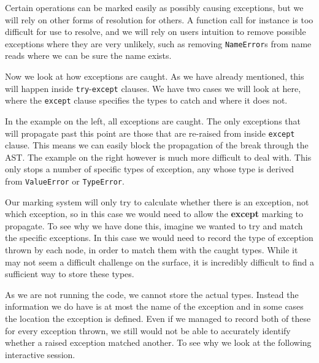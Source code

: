 \documentclass[twoside,a4paper]{report}
\begin{document}
Certain operations can be marked easily as possibly causing exceptions, but we will rely on other forms of resolution for others. A function call for instance
is too difficult for use to resolve, and we will rely on users intuition to remove possible exceptions where they are very unlikely, such as removing
\texttt{NameError}s from name reads where we can be sure the name exists.

Now we look at how exceptions are caught. As we have already mentioned, this will happen inside \texttt{try}-\texttt{except} clauses. We have two cases we
will look at here, where the \texttt{except} clause specifies the types to catch and where it does not.

\begin{minipage}[b]{0.4\linewidth}
\centering

\end{minipage}
\hspace{1cm}
\begin{minipage}[b]{0.5\linewidth}
\centering

\end{minipage}

In the example on the left, all exceptions are caught. The only exceptions that will propagate past this point are those that are re-raised from inside
\texttt{except} clause. This means we can easily block the propagation of the break through the AST. The example on the right however is much more difficult
to deal with. This only stops a number of specific types of exception, any whose type is derived from \texttt{ValueError} or \texttt{TypeError}.

Our marking system will only try to calculate whether there is an exception, not which exception, so in this case we would need to allow the \textbf{except}
marking to propagate. To see why we have done this, imagine we wanted to try and match the specific exceptions. In this case we would need to record the type
of exception thrown by each node, in order to match them with the caught types. While it may not seem a difficult challenge on the surface, it is incredibly
difficult to find a sufficient way to store these types.

As we are not running the code, we cannot store the actual types. Instead the information we do have is at most the name of the exception and in some cases
the location the exception is defined. Even if we managed to record both of these for every exception thrown, we still would not be able to accurately identify
whether a raised exception matched another. To see why we look at the following interactive session.
\end{document}
